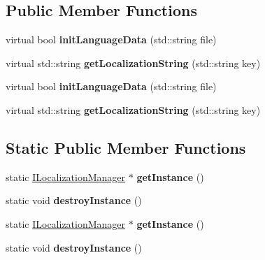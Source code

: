 \subsection*{Public Member Functions}
\begin{DoxyCompactItemize}
\item 
\mbox{\label{classcocostudio_1_1BinLocalizationManager_a2b30b7e6f4657f3a56132ba4f9419181}} 
virtual bool {\bfseries init\+Language\+Data} (std\+::string file)
\item 
\mbox{\label{classcocostudio_1_1BinLocalizationManager_a8342caac2c095d6a9e63d07934b498b8}} 
virtual std\+::string {\bfseries get\+Localization\+String} (std\+::string key)
\item 
\mbox{\label{classcocostudio_1_1BinLocalizationManager_af81dfaeae1f915da14282ce391e5be61}} 
virtual bool {\bfseries init\+Language\+Data} (std\+::string file)
\item 
\mbox{\label{classcocostudio_1_1BinLocalizationManager_a7fb890df9a6b0afc422437b7b43ae29c}} 
virtual std\+::string {\bfseries get\+Localization\+String} (std\+::string key)
\end{DoxyCompactItemize}
\subsection*{Static Public Member Functions}
\begin{DoxyCompactItemize}
\item 
\mbox{\label{classcocostudio_1_1BinLocalizationManager_ac6abd0732fe84c2d6a3dbf213b39d3e5}} 
static \hyperlink{classcocostudio_1_1ILocalizationManager}{I\+Localization\+Manager} $\ast$ {\bfseries get\+Instance} ()
\item 
\mbox{\label{classcocostudio_1_1BinLocalizationManager_a6c704093b53d224b3b660dda5338b368}} 
static void {\bfseries destroy\+Instance} ()
\item 
\mbox{\label{classcocostudio_1_1BinLocalizationManager_abee376a30d2050616aeec8a9b5810123}} 
static \hyperlink{classcocostudio_1_1ILocalizationManager}{I\+Localization\+Manager} $\ast$ {\bfseries get\+Instance} ()
\item 
\mbox{\label{classcocostudio_1_1BinLocalizationManager_a5a500e17d2b954288c7f1e0fe2f650cd}} 
static void {\bfseries destroy\+Instance} ()
\end{DoxyCompactItemize}
